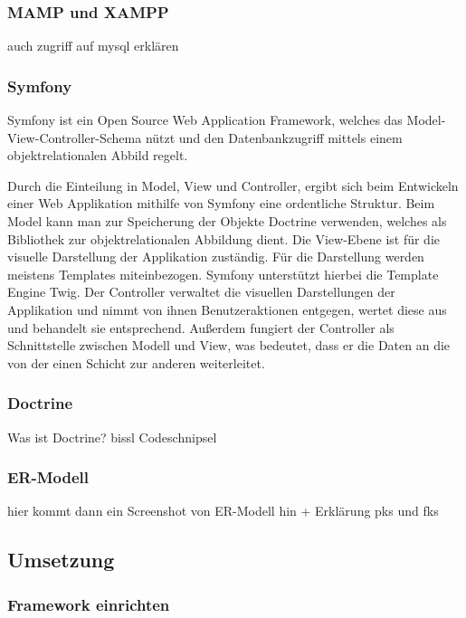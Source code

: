     \subsubsection{MAMP und XAMPP}

auch zugriff auf mysql erklären

    \subsubsection{Symfony}
    
Symfony ist ein Open Source Web Application Framework, welches das Model-View-Controller-Schema nützt und den Datenbankzugriff mittels einem objektrelationalen Abbild regelt. 

Durch die Einteilung in Model, View und Controller, ergibt sich beim Entwickeln einer Web Applikation mithilfe von Symfony eine ordentliche Struktur. 
Beim Model kann man zur Speicherung der Objekte Doctrine verwenden, welches als Bibliothek zur objektrelationalen Abbildung dient.
Die View-Ebene ist für die visuelle Darstellung der Applikation zuständig. Für die  Darstellung werden meistens Templates miteinbezogen. Symfony unterstützt hierbei die Template Engine Twig. 
Der Controller verwaltet die visuellen Darstellungen der Applikation und nimmt von ihnen Benutzeraktionen entgegen, wertet diese aus und behandelt sie entsprechend. Außerdem fungiert der Controller als Schnittstelle zwischen Modell und View, was bedeutet, dass er die Daten an die von der einen Schicht zur anderen weiterleitet.


    \subsubsection{Doctrine}

Was ist Doctrine?
bissl Codeschnipsel

    \subsubsection{ER-Modell}

hier kommt dann ein Screenshot von ER-Modell hin + Erklärung pks und fks

  \subsection{Umsetzung}
  
    \subsubsection{Framework einrichten}

